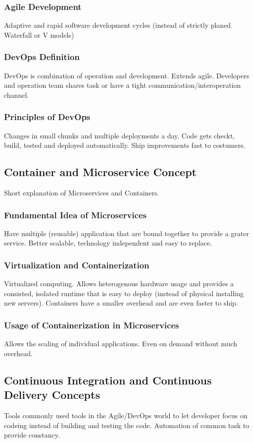 \documentclass[12pt, a4paper]{article}
\begin{document}
        \subsubsection{Agile Development}
        Adaptive and rapid software development cycles (instead of strictly planed Waterfall or V models)
        \subsubsection{DevOps Definition}
        DevOps is combination of operation and development. Extends agile. Developers and operation team shares task or have a tight communication/interoperation channel.
        \subsubsection{Principles of DevOps}\label{ssec::devops_princibles}
        Changes in small chunks and multiple deployments a day. Code gets checkt, build, tested and deployed automatically. Ship improvements fast to costumers.

    \subsection{Container and Microservice Concept}\label{ssec::microservices}
    Short explanation of Microservices and Containers.
        \subsubsection{Fundamental Idea of Microservices}
        Have multiple (reusable) application that are bound together to provide a grater service. Better scalable, technology independent and easy to replace.
        \subsubsection{Virtualization and Containerization}
        Virtualized computing. Allows heterogenous hardware usage and provides a consisted, isolated runtime that is easy to deploy (instead of physical installing new servers). Containers have a smaller overhead and are even faster to ship.
        \subsubsection{Usage of Containerization in Microservices}
        Allows the scaling of individual applications. Even on demand without much overhead.
    \subsection{Continuous Integration and Continuous Delivery Concepts}\label{ssec::ci_cd}
    Tools commonly used tools in the Agile/DevOps world to let developer focus on codeing instead of building and testing the code. Automation of common task to provide constancy.
\end{document}
